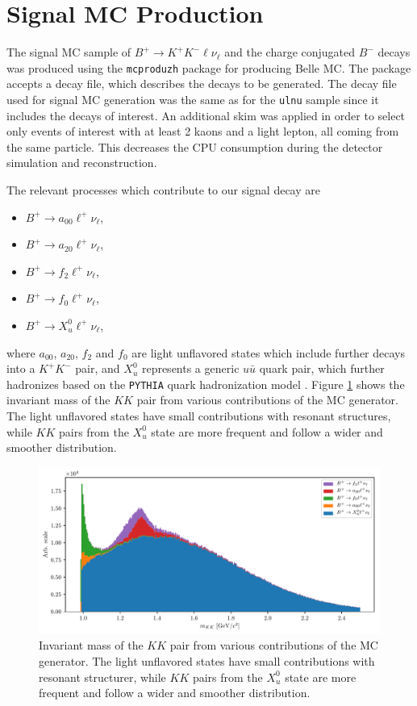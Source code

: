 \section{Signal MC Production}

The signal MC sample of $B^+ \to K^+ K^- \ell \nu_\ell$ and the charge conjugated $B^-$ decays was produced using the \texttt{mcproduzh} \cite{lange2001evtgen,agostinelli2003geant4} package for producing Belle MC. The package accepts a decay file, which describes the decays to be generated. The decay file used for signal MC generation was the same as for the \texttt{ulnu} sample since it includes the decays of interest. An additional skim was applied in order to select only events of interest with at least 2 kaons and a light lepton, all coming from the same particle. This decreases the CPU consumption during the detector simulation and reconstruction.

The relevant processes which contribute to our signal decay are
\begin{itemize}
	\item $B^+ \to a_{00} \ell^+ \nu_\ell$,
	\item $B^+ \to a_{20} \ell^+ \nu_\ell$,
	\item $B^+ \to f_{2} \ell^+ \nu_\ell$,
	\item $B^+ \to f_{0} \ell^+ \nu_\ell$,
	\item $B^+ \to X_{u}^0 \ell^+ \nu_\ell$,
\end{itemize}
where $a_{00}$, $a_{20}$, $f_{2}$ and $f_{0}$ are light unflavored states which include further decays into a $K^+K^-$ pair, and $X_u^0$ represents a generic $u \bar u$ quark pair, which further hadronizes based on the \texttt{PYTHIA} quark hadronization model \cite{sjostrand2006pythia}. Figure \ref{fig:KKsrc} shows the invariant mass of the $KK$ pair from various contributions of the MC generator. The light unflavored states have small contributions with resonant structures, while $KK$ pairs from the $X_u^0$ state are more frequent and follow a wider and smoother distribution.

\begin{figure}[H]
	\centering
	\includegraphics[width=\linewidth]{fig/KKlnu_src}
	\captionsetup{width=.8\linewidth}
	\caption{Invariant mass of the $KK$ pair from various contributions of the MC generator. The light unflavored states have small contributions with resonant structurer, while $KK$ pairs from the $X_u^0$ state are more frequent and follow a wider and smoother distribution.}
	\label{fig:KKsrc}
\end{figure}

